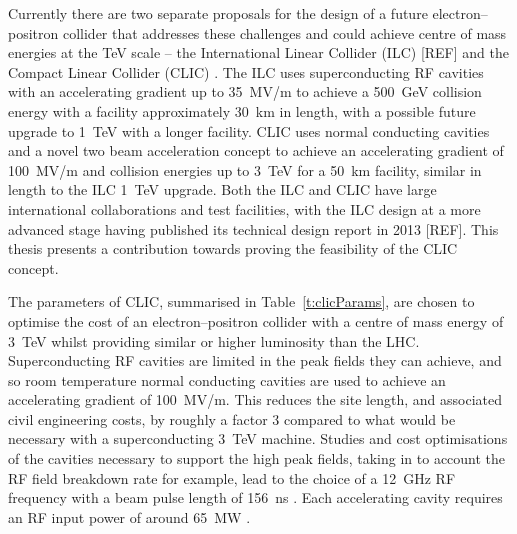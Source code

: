Currently there are two separate proposals for the design of a future electron--positron collider that addresses these challenges and could achieve centre of mass energies at the TeV scale -- the International Linear Collider (ILC) [REF] and the Compact Linear Collider (CLIC) \cite{clicCDR}. The ILC uses superconducting RF cavities with an accelerating gradient up to 35~MV/m to achieve a 500~GeV collision energy with a facility approximately 30~km in length, with a possible future upgrade to 1~TeV with a longer facility.  CLIC uses normal conducting cavities and a novel two beam acceleration concept to achieve an accelerating gradient of 100~MV/m and collision energies up to 3~TeV for a 50~km facility, similar in length to the ILC 1~TeV upgrade. Both the ILC and CLIC have large international collaborations and test facilities, with the ILC design at a more advanced stage having published its technical design report in 2013 [REF]. This thesis presents a contribution towards proving the feasibility of the CLIC concept.


The parameters of CLIC, summarised in Table~\ref{t:clicParams}, are chosen to optimise the cost of an electron--positron collider with a centre of mass energy of 3~TeV whilst providing similar or higher luminosity than the LHC. Superconducting RF cavities are limited in the peak fields they can achieve, and so room temperature normal conducting cavities are used to achieve an accelerating gradient of 100~MV/m. This reduces the site length, and associated civil engineering costs, by roughly a factor 3 compared to what would be necessary with a superconducting 3~TeV machine. Studies and cost optimisations of the cavities necessary to support the high peak fields, taking in to account the RF field breakdown rate for example, lead to the choice of a 12~GHz RF frequency with a beam pulse length of 156~ns \cite{clicCDR}. Each accelerating cavity requires an RF input power of around 65~MW \cite{clicCDR}.

